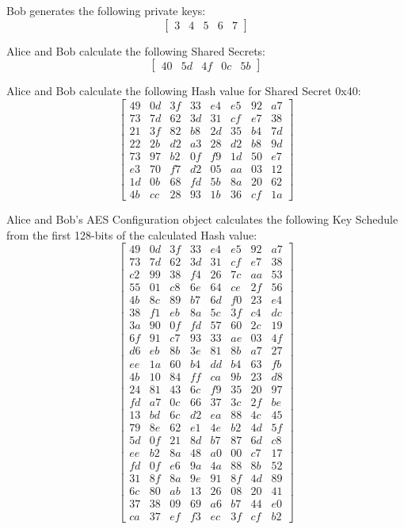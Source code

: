 \documentclass[journal]{IEEEtran}
\begin{document}
Bob generates the following private keys:
$$
\begin{bmatrix} 
3 & 4 & 5 & 6 & 7
\end{bmatrix}
$$

Alice and Bob calculate the following Shared Secrets:
$$
\begin{bmatrix}
40 & 5d & 4f & 0c & 5b
\end{bmatrix}
$$

Alice and Bob calculate the following Hash value for Shared Secret 0x40:
$$
\begin{bmatrix}
49 & 0d & 3f & 33 & e4 & e5 & 92 & a7 \\
73 & 7d & 62 & 3d & 31 & cf & e7 & 38 \\
21 & 3f & 82 & b8 & 2d & 35 & b4 & 7d \\
22 & 2b & d2 & a3 & 28 & d2 & b8 & 9d \\
73 & 97 & b2 & 0f & f9 & 1d & 50 & e7 \\
e3 & 70 & f7 & d2 & 05 & aa & 03 & 12 \\
1d & 0b & 68 & fd & 5b & 8a & 20 & 62 \\
4b & cc & 28 & 93 & 1b & 36 & cf & 1a 
\end{bmatrix}
$$

Alice and Bob's AES Configuration object calculates the following Key Schedule from the first 128-bits of the calculated Hash value:
$$
\begin{bmatrix}
49 & 0d & 3f & 33 & e4 & e5 & 92 & a7 \\
73 & 7d & 62 & 3d & 31 & cf & e7 & 38 \\
c2 & 99 & 38 & f4 & 26 & 7c & aa & 53 \\
55 & 01 & c8 & 6e & 64 & ce & 2f & 56 \\
4b & 8c & 89 & b7 & 6d & f0 & 23 & e4 \\
38 & f1 & eb & 8a & 5c & 3f & c4 & dc \\
3a & 90 & 0f & fd & 57 & 60 & 2c & 19 \\
6f & 91 & c7 & 93 & 33 & ae & 03 & 4f \\
d6 & eb & 8b & 3e & 81 & 8b & a7 & 27 \\
ee & 1a & 60 & b4 & dd & b4 & 63 & fb \\
4b & 10 & 84 & ff & ca & 9b & 23 & d8 \\
24 & 81 & 43 & 6c & f9 & 35 & 20 & 97 \\
fd & a7 & 0c & 66 & 37 & 3c & 2f & be \\
13 & bd & 6c & d2 & ea & 88 & 4c & 45 \\
79 & 8e & 62 & e1 & 4e & b2 & 4d & 5f \\
5d & 0f & 21 & 8d & b7 & 87 & 6d & c8 \\
ee & b2 & 8a & 48 & a0 & 00 & c7 & 17 \\
fd & 0f & e6 & 9a & 4a & 88 & 8b & 52 \\
31 & 8f & 8a & 9e & 91 & 8f & 4d & 89 \\
6c & 80 & ab & 13 & 26 & 08 & 20 & 41 \\
37 & 38 & 09 & 69 & a6 & b7 & 44 & e0 \\
ca & 37 & ef & f3 & ec & 3f & cf & b2
\end{bmatrix}
$$
\end{document}
